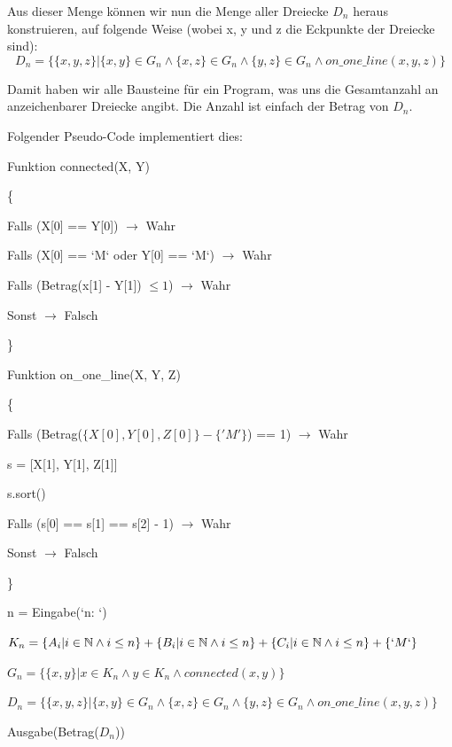 \documentclass[11pt]{article}
\begin{document}
    Aus dieser Menge können wir nun die Menge aller Dreiecke $D_n$ heraus konstruieren, auf folgende Weise
    (wobei x, y und z die Eckpunkte der Dreiecke sind):
    \[D_n = \{\{x, y, z\} \vert \{x, y\} \in G_n \land \{x, z\} \in G_n \land \{y, z\} \in G_n \land on\_one\_line(x, y, z)\}\]

    Damit haben wir alle Bausteine für ein Program, was uns die Gesamtanzahl an anzeichenbarer Dreiecke angibt.
    Die Anzahl ist einfach der Betrag von $D_n$.

    Folgender Pseudo-Code implementiert dies:

    \begin{tcolorbox}

        Funktion connected(X, Y)

        \{

            Falls (X[0] == Y[0]) $\rightarrow$ Wahr

            Falls (X[0] == `M` oder Y[0] == `M`) $\rightarrow$ Wahr

            Falls (Betrag(x[1] - Y[1]) $\le 1$) $\rightarrow$ Wahr

            Sonst $\rightarrow$ Falsch

        \}

        \bigskip

        Funktion on\_one\_line(X, Y, Z)

        \{

            Falls (Betrag($\{X[0], Y[0], Z[0]\} - \{'M'\}$) == 1) $\rightarrow$ Wahr

            s = [X[1], Y[1], Z[1]]

            s.sort()

            Falls (s[0] == s[1] == s[2] - 1) $\rightarrow$ Wahr

            Sonst $\rightarrow$ Falsch

        \}

        \bigskip

        n = Eingabe(`n: `)

        $K_n = \{A_i | i \in \mathbb{N} \land i \le n\} + \{B_i | i \in \mathbb{N} \land i \le n\} + \{C_i | i \in \mathbb{N} \land i \le n\} + \{`M`\}$

        $G_n = \{\{x, y\} | x \in K_n \land y \in K_n \land connected(x, y)\}$

        $D_n = \{\{x, y, z\} \vert \{x, y\} \in G_n \land \{x, z\} \in G_n \land \{y, z\} \in G_n \land on\_one\_line(x, y, z)\}$

        Ausgabe(Betrag($D_n$))

    \end{tcolorbox}
\end{document}
